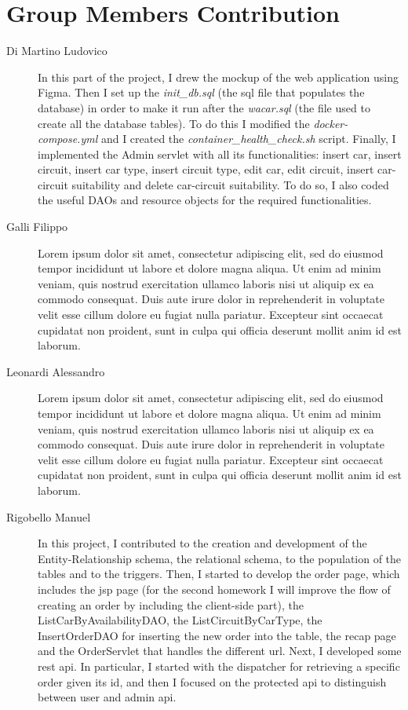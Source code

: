 \section{Group Members Contribution}


\begin{description}
	\item[Di Martino Ludovico] In this part of the project, I drew the mockup of the web application using Figma. Then I set up the \textit{init\_db.sql} (the sql file that populates the database) in order to make it run after the \textit{wacar.sql} (the file used to create all the database tables). To do this I modified the \textit{docker-compose.yml} and I created the \textit{container\_health\_check.sh} script. Finally, I implemented the Admin servlet with all its functionalities: insert car, insert circuit, insert car type, insert circuit type, edit car, edit circuit, insert car-circuit suitability and delete car-circuit suitability. To do so, I also coded the useful DAOs and resource objects for the required functionalities.
	\item[Galli Filippo] Lorem ipsum dolor sit amet, consectetur adipiscing elit, sed do eiusmod tempor incididunt ut labore et dolore magna aliqua. Ut enim ad minim veniam, quis nostrud exercitation ullamco laboris nisi ut aliquip ex ea commodo consequat. Duis aute irure dolor in reprehenderit in voluptate velit esse cillum dolore eu fugiat nulla pariatur. Excepteur sint occaecat cupidatat non proident, sunt in culpa qui officia deserunt mollit anim id est laborum.
	\item[Leonardi Alessandro] Lorem ipsum dolor sit amet, consectetur adipiscing elit, sed do eiusmod tempor incididunt ut labore et dolore magna aliqua. Ut enim ad minim veniam, quis nostrud exercitation ullamco laboris nisi ut aliquip ex ea commodo consequat. Duis aute irure dolor in reprehenderit in voluptate velit esse cillum dolore eu fugiat nulla pariatur. Excepteur sint occaecat cupidatat non proident, sunt in culpa qui officia deserunt mollit anim id est laborum.
	\item[Rigobello Manuel] In this project, I contributed to the creation and development of the Entity-Relationship schema, the relational schema, to the population of the tables and to the triggers. Then, I started to develop the order page, which includes the jsp page (for the second homework I will improve the flow of creating an order by including the client-side part), the ListCarByAvailabilityDAO, the ListCircuitByCarType, the InsertOrderDAO for inserting the new order into the table, the recap page and the OrderServlet that handles the different url. Next, I developed some rest api. In particular, I started with the dispatcher for retrieving a specific order given its id, and then I focused on the protected api to distinguish between user and admin api.

\end{description}
